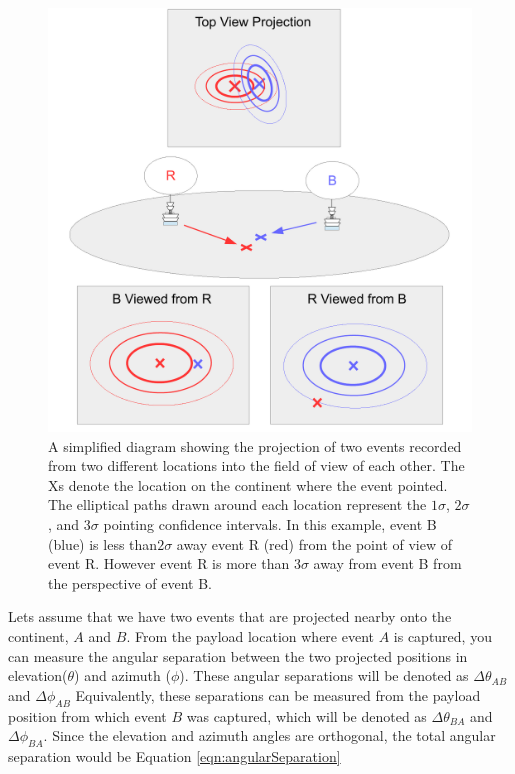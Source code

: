 \begin{figure}
	\centering
	\includegraphics[width=\textwidth]{figures/clusteringProjection}
	\caption{A simplified diagram showing the projection of two events recorded from two different locations into the field of view of each other.  The Xs denote the location on the continent where the event pointed.  The elliptical paths drawn around each location represent the $1\sigma$, $2\sigma$, and $3\sigma$ pointing confidence intervals.  In this example, event B (blue) is less than$2\sigma$ away event R (red) from the point of view of event R.  However event R is more than $3\sigma$ away from event B from the perspective of event B.} 
	\label{fig:clusteringProjection}
\end{figure}
		
		
		Lets assume that we have two events that are projected nearby onto the continent, $A$ and $B$.  From the payload location where event $A$ is captured, you can measure the angular separation between the two projected positions in elevation($\theta$) and azimuth ($\phi$).  These angular separations will be denoted as $\Delta\theta_{AB}$ and $\Delta\phi_{AB}$  Equivalently, these separations can be measured from the payload position from which event $B$ was captured, which will be denoted as $\Delta\theta_{BA}$ and $\Delta\phi_{BA}$.  Since the elevation and azimuth angles are orthogonal, the total angular separation would be Equation \ref{eqn:angularSeparation}
		
